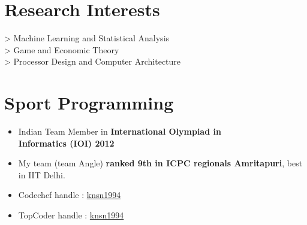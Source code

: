 \documentclass[10pt]{article} %
\begin{document}
{\begin{minipage}[t]{0.5\textwidth}
\section{Research Interests} 
> Machine Learning and Statistical Analysis\\[5pt]
> Game and Economic Theory\\[5pt]
> Processor Design and Computer Architecture\\
	

\section{Sport Programming} 
\begin{itemize}
\item Indian Team Member in {\bf International Olympiad in \\ Informatics (IOI) 2012}  
\item My team (team Angle) {\bf ranked 9th in ICPC regionals Amritapuri}, best in IIT Delhi.
\item Codechef handle : \href{http://www.codechef.com/users/knsn1994}{knsn1994}
\item TopCoder handle : \href{http://community.topcoder.com/tc?module=MemberProfile&cr=22917652}{knsn1994}
\end{itemize}



\end{minipage}}
\end{document}
